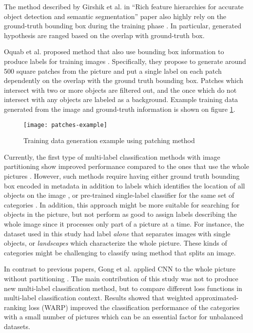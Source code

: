The method described by Girshik et al. in ``Rich feature hierarchies for accurate object detection and semantic segmentation'' paper also highly rely on the ground-truth bounding box during the training phase \cite{Girshick2014}. In particular, generated hypothesis are ranged based on the overlap with ground-truth box.

Oquab et al. proposed method that also use bounding box information to produce labels for training images \cite{Oquab2014TransferringMidLevel}. Specifically, they propose to generate around 500 square patches from the picture and put a single label on each patch dependently on the overlap with the ground truth bounding box. Patches which intersect with two or more objects are filtered out, and the once which do not intersect with any objects are labeled as a background. Example training data generated from the image and ground-truth information is shown on figure \ref{fig:patches-example}.

\begin{figure}
    \centering
    \texttt{[image: patches-example]}
    \caption{Training data generation example using patching method \cite{Oquab2014TransferringMidLevel}}
    \label{fig:patches-example}
\end{figure}

Currently, the first type of multi-label classification methods with image partitioning show improved performance compared to the ones that use the whole pictures \cite{Wei2016HCP, Yang2015, Ren2016}. However, such methods require having either ground truth bounding box encoded in metadata in addition to labels which identifies the location of all objects on the image \cite{Chen2015ContextualizingClassification, Dong2013Subcategory-AwareClassification}, or pre-trained single-label classifier for the same set of categories \cite{Wei2016HCP}. In addition, this approach might be more suitable for searching for objects in the picture, but not perform as good to assign labels describing the whole image since it processes only part of a picture at a time. For instance, the dataset used in this study had label \textit{alone} that separates images with single objects, or \textit{landscapes} which characterize the whole picture. These kinds of categories might be challenging to classify using method that splits an image.

In contrast to previous papers, Gong et al. applied CNN to the whole picture without partitioning \cite{Gong2013DeepRanking}. The main contribution of this study was not to produce new multi-label classification method, but to compare different loss functions in multi-label classification context. Results showed that weighted approximated-ranking loss (WARP) improved the classification performance of the categories with a small number of pictures which can be an essential factor for unbalanced datasets.

